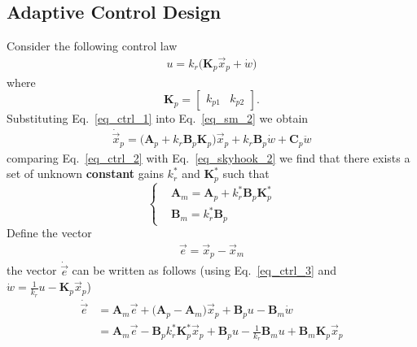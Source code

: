 \documentclass[11pt,a4paper,oneside]{book}
\numberwithin{equation}{section}
\theoremstyle{it}
\theoremstyle{definition}
\begin{document}
\subsection{Adaptive Control Design} 
Consider the following control law
\begin{equation}\label{eq_ctrl_1}
	\begin{aligned}
		u = k_r\big(\mathbf{K}_p\vec{x}_p + \dot{w}\big)
	\end{aligned}
\end{equation} 
where \begin{equation}
	\mathbf{K}_p=\begin{bmatrix} k_{p1} & k_{p2}\end{bmatrix}.
\end{equation}
Substituting Eq.~\ref{eq_ctrl_1} into Eq.~\ref{eq_sm_2} we obtain
\begin{equation}\label{eq_ctrl_2}
	\begin{aligned}
		\dot{\vec{x}}_p = \Bigg(\mathbf{A}_p+k_r\mathbf{B}_p\mathbf{K}_p\Bigg){\vec{x}}_p + k_r\mathbf{B}_p \dot{w} + \mathbf{C}_p\ddot{w} 
	\end{aligned}
\end{equation}
comparing Eq.~\ref{eq_ctrl_2} with Eq.~\ref{eq_skyhook_2} we find that there exists a set of unknown \textbf{constant} gains $k_r^*$ and $\mathbf{K}_p^*$ such that
\begin{equation}\label{eq_ctrl_3}
	\left\lbrace \begin{aligned}
		&\mathbf{A}_m = \mathbf{A}_p+k_r^* \mathbf{B}_p \mathbf{K}_p^* \\[6pt]
		&\mathbf{B}_m = k_r^*\mathbf{B}_p
	\end{aligned}\right. 
\end{equation}
Define the vector
\begin{equation}\label{eq_ctrl_4}
	\begin{aligned}
		\vec{e} = \vec{x}_p-\vec{x}_m
	\end{aligned}
\end{equation}
the vector $\dot{\vec{e}}$ can be written as follows (using Eq.~\ref{eq_ctrl_3} and $\dot{w}=\frac{1}{k_r}u-\mathbf{K}_p\vec{x}_p$)
\begin{equation}\label{eq_ctrl_5}
	\begin{aligned}
		\dot{\vec{e}} &= \mathbf{A}_m\vec{e}+\Big(\mathbf{A}_p-\mathbf{A}_m\Big)\vec{x}_p+\mathbf{B}_pu-\mathbf{B}_m\dot{w} \\[8pt]
		&= \mathbf{A}_m\vec{e}-\mathbf{B}_pk_r^*\mathbf{K}_p^*\vec{x}_p+\mathbf{B}_pu-\frac{1}{k_r}\mathbf{B}_mu+\mathbf{B}_m\mathbf{K}_p\vec{x}_p
	\end{aligned}
\end{equation}
\end{document}

